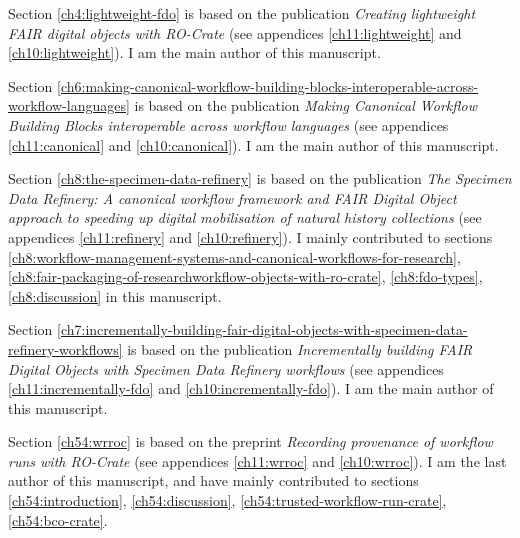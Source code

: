 Section \ref{ch4:lightweight-fdo} is based on the publication \emph{Creating lightweight FAIR digital objects with RO-Crate} \cite{Soiland-Reyes 2022c} (see appendices \ref{ch11:lightweight} and \ref{ch10:lightweight}). I am the main author of this manuscript.

Section \ref{ch6:making-canonical-workflow-building-blocks-interoperable-across-workflow-languages} is based on the publication \emph{Making Canonical Workflow Building Blocks interoperable across workflow languages} \cite{Soiland-Reyes 2022b} (see appendices \ref{ch11:canonical} and \ref{ch10:canonical}). I am the main author of this manuscript.

Section \ref{ch8:the-specimen-data-refinery} is based on the publication \emph{The Specimen Data Refinery: A
canonical workflow framework and FAIR Digital Object approach to speeding up digital mobilisation of natural history collections} \cite{Hardisty 2022} (see appendices \ref{ch11:refinery} and \ref{ch10:refinery}). I mainly contributed to sections \ref{ch8:workflow-management-systems-and-canonical-workflows-for-research}, \ref{ch8:fair-packaging-of-researchworkflow-objects-with-ro-crate}, \ref{ch8:fdo-types}, \ref{ch8:discussion} in this manuscript.

Section \ref{ch7:incrementally-building-fair-digital-objects-with-specimen-data-refinery-workflows} is based on the publication \emph{Incrementally building FAIR Digital Objects with Specimen Data
Refinery workflows} \cite{Woolland 2022} (see appendices \ref{ch11:incrementally-fdo} and \ref{ch10:incrementally-fdo}). I am the main author of this manuscript.

Section \ref{ch54:wrroc} is based on the preprint \emph{
Recording provenance of workflow runs with RO-Crate} \cite{Leo 2023b} (see appendices \ref{ch11:wrroc} and \ref{ch10:wrroc}). I am the last author of this manuscript, and have mainly contributed to sections \ref{ch54:introduction}, \ref{ch54:discussion}, \ref{ch54:trusted-workflow-run-crate}, \ref{ch54:bco-crate}.
